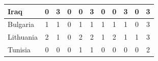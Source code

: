 \documentclass[12pt]{article}  %
\begin{document}
\begin{subappendices}
\begin{longtable}{|l|c|c|c|c|c|c|c|c|c|c|}
	\hline
	Iraq                                                           & 0                                                                      & 3                                                                      & 0                                                                      & 0                                                                      & 3                                                                      & 0                                                                      & 0                         & 3                           & 0                           & 3                           \\ 
	\hline
	Bulgaria                                                       & 1                                                                      & 1                                                                      & 0                                                                      & 1                                                                      & 1                                                                      & 1                                                                      & 1                         & 1                           & 0                           & 3                           \\ 
	\hline
	Lithuania                                                      & 2                                                                      & 1                                                                      & 0                                                                      & 2                                                                      & 2                                                                      & 1                                                                      & 2                         & 1                           & 1                           & 3                           \\ 
	\hline
	Tunisia                                                        & 0                                                                      & 0                                                                      & 0                                                                      & 1                                                                      & 1                                                                      & 0                                                                      & 0                         & 0                           & 0                           & 2                           \\ 

\end{longtable}
\end{subappendices}
\end{document}
